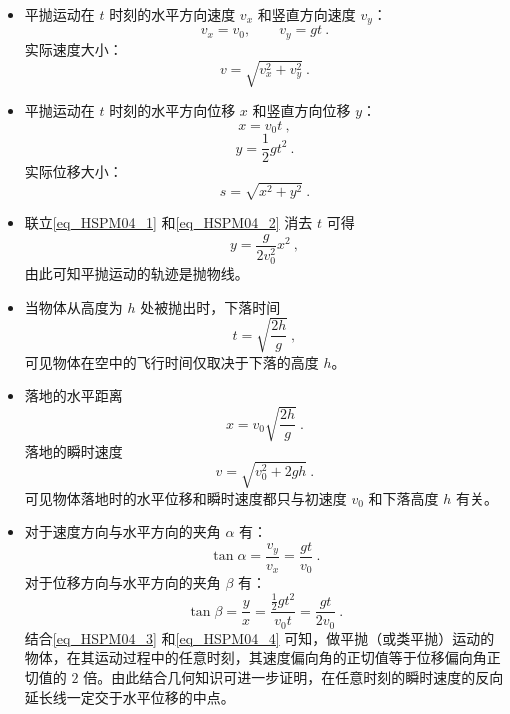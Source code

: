 \begin{itemize}
\item 平抛运动在 $t$ 时刻的水平方向速度 $v_x$ 和竖直方向速度 $v_y$：
\begin{equation}
v_x=v_0,\qquad 
v_y=gt~.
\end{equation}
实际速度大小：
\begin{equation}
v=\sqrt{v_x^2+v_y^2}~.
\end{equation}

\item 平抛运动在 $t$ 时刻的水平方向位移 $x$ 和竖直方向位移 $y$：
\begin{equation}\label{eq_HSPM04_1}
x=v_0t~,
\end{equation}
\begin{equation}\label{eq_HSPM04_2}
y=\frac12 gt^2~.
\end{equation}
实际位移大小：
\begin{equation}
s=\sqrt{x^2+y^2}~.
\end{equation}

\item 联立\autoref{eq_HSPM04_1} 和\autoref{eq_HSPM04_2} 消去 $t$ 可得
\begin{equation}
y=\frac{g}{2v_0^2}x^2~,
\end{equation}
由此可知平抛运动的轨迹是抛物线。

\item 当物体从高度为 $h$ 处被抛出时，下落时间
\begin{equation}\label{eq_HSPM04_5}
t=\sqrt{\frac{2h}{g}}~,
\end{equation}
可见物体在空中的飞行时间仅取决于下落的高度 $h$。

\item 落地的水平距离
\begin{equation}
x=v_0\sqrt{\frac{2h}{g}}~.
\end{equation}
落地的瞬时速度
\begin{equation}
v=\sqrt{v_0^2+2gh}~.
\end{equation}
可见物体落地时的水平位移和瞬时速度都只与初速度 $v_0$ 和下落高度 $h$ 有关。

\item 对于速度方向与水平方向的夹角 $\alpha$ 有：
\begin{equation}\label{eq_HSPM04_3}
\tan \alpha = \frac {v_y}{v_x}=\frac{gt}{v_0}~.
\end{equation}
对于位移方向与水平方向的夹角 $\beta$ 有：
\begin{equation}\label{eq_HSPM04_4}
\tan \beta = \frac{y}{x}=\frac{\frac12 gt^2}{v_0t} = \frac{gt}{2v_0}~.
\end{equation}
结合\autoref{eq_HSPM04_3} 和\autoref{eq_HSPM04_4} 可知，做平抛（或类平抛）运动的物体，在其运动过程中的任意时刻，其速度偏向角的正切值等于位移偏向角正切值的 $2$ 倍。由此结合几何知识可进一步证明，在任意时刻的瞬时速度的反向延长线一定交于水平位移的中点。
\end{itemize}


